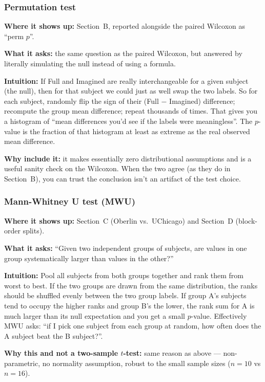 \documentclass[11pt]{article}
\begin{document}
\subsubsection*{Permutation test}

\textbf{Where it shows up:} Section~B, reported alongside the paired Wilcoxon as ``perm $p$''.

\textbf{What it asks:} the same question as the paired Wilcoxon, but answered by literally simulating the null instead of using a formula.

\textbf{Intuition:} If Full and Imagined are really interchangeable for a given subject (the null), then for that subject we could just as well swap the two labels. So for each subject, randomly flip the sign of their (Full $-$ Imagined) difference; recompute the group mean difference; repeat thousands of times. That gives you a histogram of ``mean differences you'd see if the labels were meaningless''. The $p$-value is the fraction of that histogram at least as extreme as the real observed mean difference.

\textbf{Why include it:} it makes essentially zero distributional assumptions and is a useful sanity check on the Wilcoxon. When the two agree (as they do in Section~B), you can trust the conclusion isn't an artifact of the test choice.

\subsubsection*{Mann-Whitney U test (MWU)}

\textbf{Where it shows up:} Section~C (Oberlin vs.\ UChicago) and Section~D (block-order splits).

\textbf{What it asks:} ``Given two independent groups of subjects, are values in one group systematically larger than values in the other?''

\textbf{Intuition:} Pool all subjects from both groups together and rank them from worst to best. If the two groups are drawn from the same distribution, the ranks should be shuffled evenly between the two group labels. If group A's subjects tend to occupy the higher ranks and group B's the lower, the rank sum for A is much larger than its null expectation and you get a small $p$-value. Effectively MWU asks: ``if I pick one subject from each group at random, how often does the A subject beat the B subject?''.

\textbf{Why this and not a two-sample $t$-test:} same reason as above --- non-parametric, no normality assumption, robust to the small sample sizes ($n = 10$ vs $n = 16$).
\end{document}
